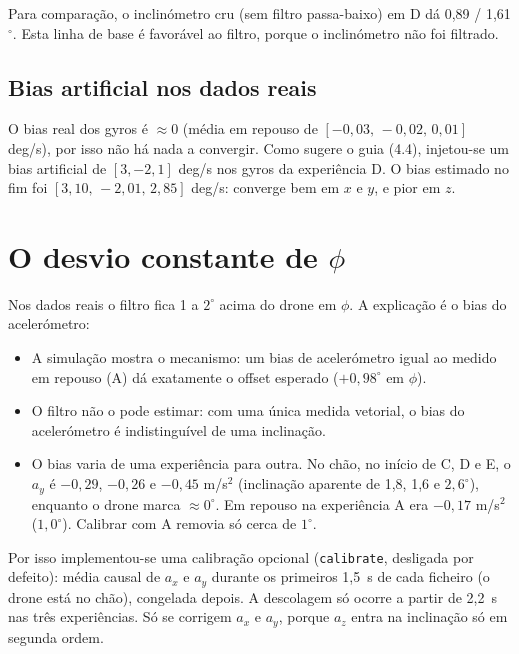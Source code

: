 \documentclass[10pt,a4paper]{article}
\newcommand{\code}[1]{\texttt{#1}}
\begin{document}
Para compara\c{c}\~ao, o inclin\'ometro cru (sem filtro passa-baixo) em D d\'a 0,89 / 1,61$^\circ$.
Esta linha de base \'e favor\'avel ao filtro, porque o inclin\'ometro n\~ao foi filtrado.

\subsection{Bias artificial nos dados reais}

O bias real dos gyros \'e $\approx 0$ (m\'edia em repouso de $[-0{,}03,\,-0{,}02,\,0{,}01]$ deg/s), por isso n\~ao h\'a nada a convergir.
Como sugere o guia (4.4), injetou-se um bias artificial de $[3,-2,1]$ deg/s nos gyros da experi\^encia D.
O bias estimado no fim foi $[3{,}10,\,-2{,}01,\,2{,}85]$ deg/s: converge bem em $x$ e $y$, e pior em $z$.

\section{O desvio constante de \texorpdfstring{$\phi$}{phi}}

Nos dados reais o filtro fica 1 a $2^\circ$ acima do drone em $\phi$.
A explica\c{c}\~ao \'e o bias do aceler\'ometro:
\begin{itemize}
  \item A simula\c{c}\~ao mostra o mecanismo: um bias de aceler\'ometro igual ao medido em repouso (A) d\'a exatamente o offset esperado ($+0{,}98^\circ$ em $\phi$).
  \item O filtro n\~ao o pode estimar: com uma \'unica medida vetorial, o bias do aceler\'ometro \'e indistingu\'ivel de uma inclina\c{c}\~ao.
  \item O bias varia de uma experi\^encia para outra. No ch\~ao, no in\'icio de C, D e E, o $a_y$ \'e $-0{,}29$, $-0{,}26$ e $-0{,}45$ m/s$^2$ (inclina\c{c}\~ao aparente de 1,8, 1,6 e $2{,}6^\circ$), enquanto o drone marca $\approx 0^\circ$. Em repouso na experi\^encia A era $-0{,}17$ m/s$^2$ ($1{,}0^\circ$). Calibrar com A removia s\'o cerca de $1^\circ$.
\end{itemize}

Por isso implementou-se uma calibra\c{c}\~ao opcional (\code{calibrate}, desligada por defeito): m\'edia causal de $a_x$ e $a_y$ durante os primeiros 1,5~s de cada ficheiro (o drone est\'a no ch\~ao), congelada depois.
A descolagem s\'o ocorre a partir de 2,2~s nas tr\^es experi\^encias.
S\'o se corrigem $a_x$ e $a_y$, porque $a_z$ entra na inclina\c{c}\~ao s\'o em segunda ordem.
\end{document}
